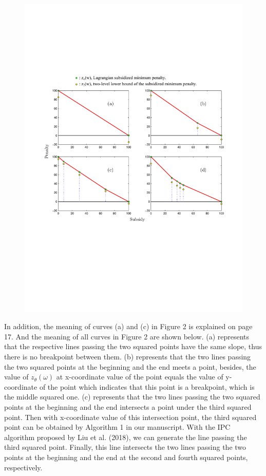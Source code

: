 \documentclass[11pt]{article}
\begin{document}
\begin{figure}[H]
\centering
\includegraphics[width=1\textwidth]{1.pdf}
\centering
\end{figure}
In addition, the meaning of curves (a) and (c) in Figure 2 is explained on page 17.
And the meaning of all curves in Figure 2 are shown below. (a) represents that the respective lines passing the two squared points have the same slope, thus there is no breakpoint between them.
(b) represents that the two lines passing the two squared points at the beginning and the end meets a point, besides, the value of $z_\theta(\omega)$ at x-coordinate value of the point equals the value of y-coordinate of the point which indicates that this point is a breakpoint, which is the middle squared one. (c) represents that the two lines passing the two squared points at the beginning and the end intersects a point under the third squared point. Then with x-coordinate value of this intersection point, the third squared point can be obtained by Algorithm 1 in our manuscript. With the IPC algorithm proposed by Liu et al. (2018), we can generate the line passing the third squared point. Finally, this line intersects the two lines passing the two points at the beginning and the end at the second and fourth squared points, respectively.
\end{document}

